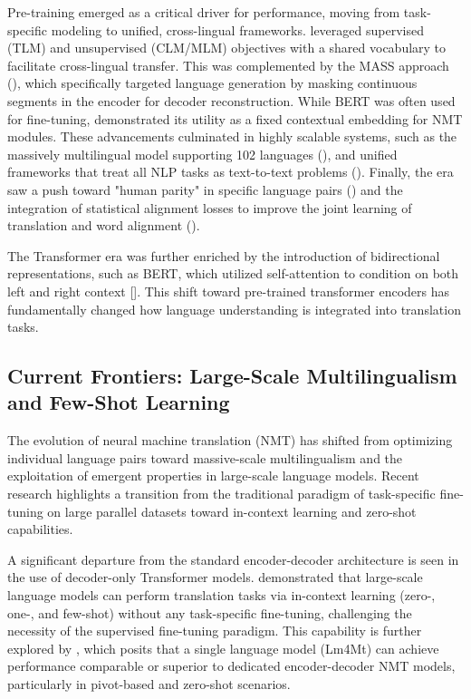 \documentclass[11pt]{article}
\begin{document}
Pre-training emerged as a critical driver for performance, moving from task-specific modeling to unified, cross-lingual frameworks. \citep{1901.07291} leveraged supervised (TLM) and unsupervised (CLM/MLM) objectives with a shared vocabulary to facilitate cross-lingual transfer. This was complemented by the MASS approach (\citep{1905.02450}), which specifically targeted language generation by masking continuous segments in the encoder for decoder reconstruction. While BERT was often used for fine-tuning, \citep{2002.06823} demonstrated its utility as a fixed contextual embedding for NMT modules. These advancements culminated in highly scalable systems, such as the massively multilingual model supporting 102 languages (\citep{1903.00089}), and unified frameworks that treat all NLP tasks as text-to-text problems (\citep{1910.10683}). Finally, the era saw a push toward "human parity" in specific language pairs (\citep{1803.05567}) and the integration of statistical alignment losses to improve the joint learning of translation and word alignment (\citep{1909.02074}).

The Transformer era was further enriched by the introduction of bidirectional representations, such as BERT, which utilized self-attention to condition on both left and right context [\citep{1810.04805}]. This shift toward pre-trained transformer encoders has fundamentally changed how language understanding is integrated into translation tasks.
\subsection{Current Frontiers: Large-Scale Multilingualism and Few-Shot Learning}

The evolution of neural machine translation (NMT) has shifted from optimizing individual language pairs toward massive-scale multilingualism and the exploitation of emergent properties in large-scale language models. Recent research highlights a transition from the traditional paradigm of task-specific fine-tuning on large parallel datasets toward in-context learning and zero-shot capabilities.

A significant departure from the standard encoder-decoder architecture is seen in the use of decoder-only Transformer models. \citep{2005.14165} demonstrated that large-scale language models can perform translation tasks via in-context learning (zero-, one-, and few-shot) without any task-specific fine-tuning, challenging the necessity of the supervised fine-tuning paradigm. This capability is further explored by \citep{2106.13627}, which posits that a single language model (Lm4Mt) can achieve performance comparable or superior to dedicated encoder-decoder NMT models, particularly in pivot-based and zero-shot scenarios.
\end{document}
